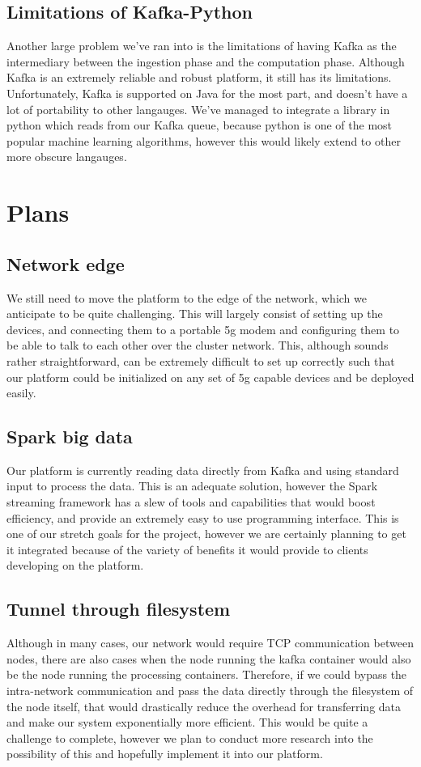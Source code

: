 \documentclass[10pt,journal,compsoc,onecolumn,draftclsnofoot]{IEEEtran}
\begin{document}
\subsection{Limitations of Kafka-Python}
Another large problem we've ran into is the limitations of having Kafka as the intermediary between the ingestion phase and the computation phase. Although Kafka is an extremely reliable and robust platform, it still has its limitations. Unfortunately, Kafka is supported on Java for the most part, and doesn't have a lot of portability to other langauges. We've managed to integrate a library in python which reads from our Kafka queue, because python is one of the most popular machine learning algorithms, however this would likely extend to other more obscure langauges. 

\section{Plans}
\subsection{Network edge}
We still need to move the platform to the edge of the network, which we anticipate to be quite challenging. This will largely consist of setting up the devices, and connecting them to a portable 5g modem and configuring them to be able to talk to each other over the cluster network. This, although sounds rather straightforward, can be extremely difficult to set up correctly such that our platform could be initialized on any set of 5g capable devices and be deployed easily. 

\subsection{Spark big data}
Our platform is currently reading data directly from Kafka and using standard input to process the data. This is an adequate solution, however the Spark streaming framework has a slew of tools and capabilities that would boost efficiency, and provide an extremely easy to use programming interface. This is one of our stretch goals for the project, however we are certainly planning to get it integrated because of the variety of benefits it would provide to clients developing on the platform.

\subsection{Tunnel through filesystem}
Although in many cases, our network would require TCP communication between nodes, there are also cases when the node running the kafka container would also be the node running the processing containers. Therefore, if we could bypass the intra-network communication and pass the data directly through the filesystem of the node itself, that would drastically reduce the overhead for transferring data and make our system exponentially more efficient. This would be quite a challenge to complete, however we plan to conduct more research into the possibility of this and hopefully implement it into our platform. 
\end{document}
